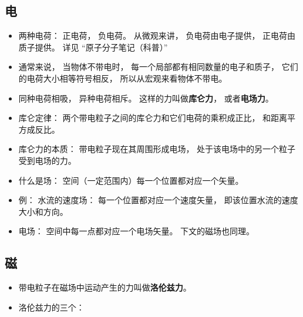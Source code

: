 
\begin{issues}
\issueDraft
\end{issues}

\subsection{电}
\begin{itemize}
\item 两种电荷： 正电荷， 负电荷。 从微观来讲， 负电荷由电子提供， 正电荷由质子提供。 详见 “原子分子笔记（科普）”
\item 通常来说， 当物体不带电时， 每一个局部都有相同数量的电子和质子， 它们的电荷大小相等符号相反， 所以从宏观来看物体不带电。
\item 同种电荷相吸， 异种电荷相斥。 这样的力叫做\textbf{库仑力}， 或者\textbf{电场力}。
\item 库仑定律： 两个带电粒子之间的库仑力和它们电荷的乘积成正比， 和距离平方成反比。
\item 库仑力的本质： 带电粒子现在其周围形成电场， 处于该电场中的另一个粒子受到电场的力。
\item 什么是场： 空间（一定范围内）每一个位置都对应一个矢量。
\item 例： 水流的速度场： 每一个位置都对应一个速度矢量， 即该位置水流的速度大小和方向。
\item 电场： 空间中每一点都对应一个电场矢量。 下文的磁场也同理。
\end{itemize}

\subsection{磁}
\begin{itemize}
\item 带电粒子在磁场中运动产生的力叫做\textbf{洛伦兹力}。
\item 洛伦兹力的三个： 
\end{itemize}
